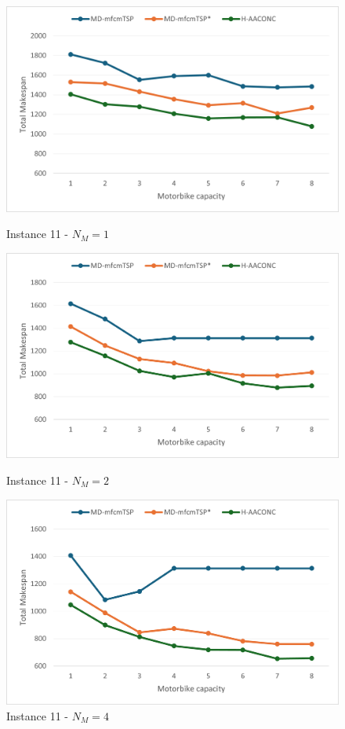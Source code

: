 \documentclass{article}
\begin{document}
	\begin{figure}[h]
		\centering
		\begin{minipage}{0.33\textwidth}
			\centering
			\includegraphics[scale=0.42]{p11_NM1}\;
			\caption{Instance 11 - $N_M=1$}
			\label{fig:p11_NM1}
		\end{minipage}
		\begin{minipage}{0.33\textwidth}
			\centering
			\includegraphics[scale=0.42]{p11_NM2}\;
			\caption{Instance 11 - $N_M=2$}
			\label{fig:p11_NM2}
		\end{minipage}
		\begin{minipage}{0.33\textwidth}
			\centering
			\includegraphics[scale=0.42]{p11_NM4}\;
			\caption{Instance 11 - $N_M=4$}
			\label{fig:p11_NM4}
		\end{minipage}
	\end{figure}
	
	
	\clearpage
	\printbibliography
	
\end{document}
